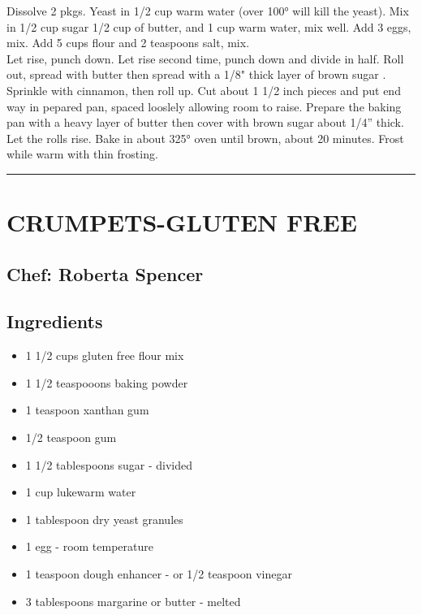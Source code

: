 \documentclass[
]{book}
\providecommand{\tightlist}{%
  \setlength{\itemsep}{0pt}\setlength{\parskip}{0pt}}
\begin{document}
Dissolve 2 pkgs. Yeast in 1/2 cup warm water (over 100° will kill the yeast). Mix in 1/2 cup sugar 1/2 cup of butter,
and 1 cup warm water, mix well. Add 3 eggs, mix. Add 5 cups flour and 2 teaspoons salt, mix.\\
Let rise, punch down. Let rise second time, punch down and divide in half. Roll out, spread with butter
then spread with a 1/8" thick layer of brown sugar . Sprinkle with cinnamon, then roll up. Cut about 1 1/2 inch pieces and put end way in
pepared pan, spaced looslely allowing room to raise. Prepare the baking pan with a heavy layer of butter then cover with brown sugar about 1/4'' thick.
Let the rolls rise. Bake in about 325° oven until brown, about 20 minutes. Frost while warm with thin frosting.

\begin{center}\rule{0.5\linewidth}{0.5pt}\end{center}

\hypertarget{crumpets-gluten-free}{%
\section*{CRUMPETS-GLUTEN FREE}\label{crumpets-gluten-free}}


\hypertarget{chef-roberta-spencer-25}{%
\subsection*{Chef: Roberta Spencer}\label{chef-roberta-spencer-25}}


\hypertarget{ingredients-76}{%
\subsection*{Ingredients}\label{ingredients-76}}


\begin{itemize}
\tightlist
\item
  1 1/2 cups gluten free flour mix
\item
  1 1/2 teaspooons baking powder
\item
  1 teaspoon xanthan gum
\item
  1/2 teaspoon gum
\item
  1 1/2 tablespoons sugar - divided
\item
  1 cup lukewarm water
\item
  1 tablespoon dry yeast granules
\item
  1 egg - room temperature
\item
  1 teaspoon dough enhancer - or 1/2 teaspoon vinegar
\item
  3 tablespoons margarine or butter - melted
\end{itemize}
\end{document}
